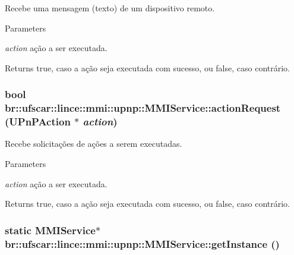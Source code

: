 Recebe uma mensagem (texto) de um dispositivo remoto. 


\begin{DoxyParams}{Parameters}
\item[{\em action}]ação a ser executada. \end{DoxyParams}
\begin{DoxyReturn}{Returns}
true, caso a ação seja executada com sucesso, ou false, caso contrário. 
\end{DoxyReturn}
\hypertarget{classbr_1_1ufscar_1_1lince_1_1mmi_1_1upnp_1_1MMIService_a7fb929d5234cabe8bccffcbace4a97dc}{
\subsubsection[{actionRequest}]{\setlength{\rightskip}{0pt plus 5cm}bool br::ufscar::lince::mmi::upnp::MMIService::actionRequest (UPnPAction $\ast$ {\em action})}}
\label{classbr_1_1ufscar_1_1lince_1_1mmi_1_1upnp_1_1MMIService_a7fb929d5234cabe8bccffcbace4a97dc}


Recebe solicitações de ações a serem executadas. 


\begin{DoxyParams}{Parameters}
\item[{\em action}]ação a ser executada. \end{DoxyParams}
\begin{DoxyReturn}{Returns}
true, caso a ação seja executada com sucesso, ou false, caso contrário. 
\end{DoxyReturn}
\hypertarget{classbr_1_1ufscar_1_1lince_1_1mmi_1_1upnp_1_1MMIService_a369cf8700f091154c446028e26c65cce}{
\subsubsection[{getInstance}]{\setlength{\rightskip}{0pt plus 5cm}static {\bf MMIService}$\ast$ br::ufscar::lince::mmi::upnp::MMIService::getInstance ()}}
\label{classbr_1_1ufscar_1_1lince_1_1mmi_1_1upnp_1_1MMIService_a369cf8700f091154c446028e26c65cce}


